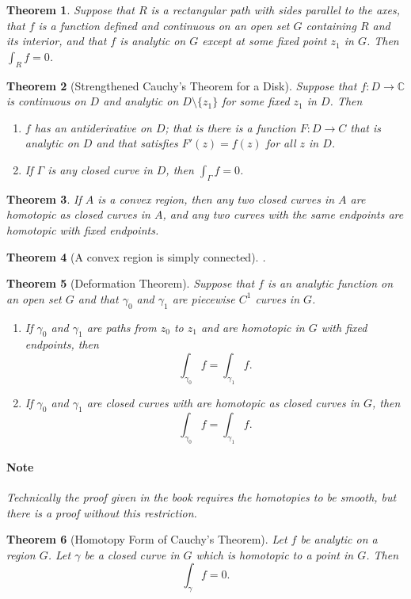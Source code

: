 \documentclass[a4paper]{article}
\newtheorem{theorem}{Theorem}
\newcommand{\C}{\mathbb{C}}
\begin{document}
\begin{theorem}
  Suppose that \(R\) is a rectangular path with sides parallel to the axes, that \(f\) is a function defined and continuous on an open set \(G\) containing \(R\) and its interior, and that \(f\) is analytic on \(G\) except at some fixed point \(z_1\) in \(G\). 
  Then \(\int_R f = 0\).
\end{theorem}






\begin{theorem}[Strengthened Cauchy's Theorem for a Disk]
  Suppose that \(f : D \to \C\) is continuous on \(D\) and analytic on \(D \setminus \{z_1\}\) for some fixed \(z_1\) in \(D\). 
  Then
  \begin{enumerate}
    \item \(f\) has an antiderivative on \(D\); that is there is a function \(F : D \to C\) that is analytic on \(D\) and that satisfies \(F'(z) = f(z)\) for all \(z\) in \(D\).
    \item If \(\Gamma\) is any closed curve in \(D\), then \(\int_\Gamma f = 0\).
  \end{enumerate}
\end{theorem}







\begin{theorem}
  If \(A\) is a convex region, then any two closed curves in \(A\) are homotopic as closed curves in \(A\), and any two curves with the same endpoints are homotopic with fixed endpoints. 
\end{theorem}

\begin{theorem}[A convex region is simply connected].
\end{theorem}

\begin{theorem}[Deformation Theorem]
  Suppose that \(f\) is an analytic function on an open set \(G\) and that \(\gamma_0\) and \(\gamma_1\) are piecewise \(C^1\) curves in \(G\). 
  \begin{enumerate}
    \item If \(\gamma_0 \) and \(\gamma_1\) are paths from \(z_0\) to \(z_1\) and are homotopic in \(G\) with fixed endpoints, then 
      \[\int_{\gamma_0} f = \int_{\gamma_1} f.\]
    \item If \(\gamma_0\) and \(\gamma_1\) are closed curves with are homotopic as closed curves in \(G\), then 
      \[\int_{\gamma_0} f = \int_{\gamma_1} f.\]
  \end{enumerate}

  \paragraph{Note}
  Technically the proof given in the book requires the homotopies to be smooth, but there is a proof without this restriction. 
\end{theorem}


\begin{theorem}[Homotopy Form of Cauchy's Theorem]
  Let \(f\) be analytic on a region \(G\). 
  Let \(\gamma\) be a closed curve in \(G\) which is homotopic to a point in \(G\). Then
  \[\int_\gamma f = 0.\]
  
\end{theorem}
\end{document}
